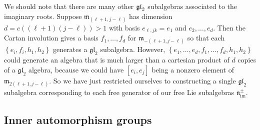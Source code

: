 \documentclass[11pt,letterpaper]{amsart}
\numberwithin{thecounter}{section}
\theoremstyle{definition}
\DeclareMathOperator{\im}{{im}}
\newcommand{\nimpm}{{\mathfrak{n}_{\im}^\pm}}
\begin{document}
%
%
%
%
%
%

We should note that there are many other $\frak{gl}_2$ subalgebras associated to the imaginary roots.
Suppose $\mathfrak{m}_{(\ell+1,j-\ell)}$ has dimension $d=c\left((\ell+1)(j-\ell) \right)>1$ with basis $e_{\ell,jk}=e_1$ and $e_2, \dots , e_d$. Then the Cartan involution gives a basis $f_1,\dots,f_d$ for $\mathfrak{m}_{-(\ell+1,j-\ell)}$ so that each  $\left\{e_i,f_i,h_1,h_2 \right\}$ generates a $\mathfrak{gl}_2$ subalgebra. However, $\left\{e_1,\dots,e_d,f_1,\dots,f_d,h_1,h_2 \right\}$ could generate an algebra that is much larger than a cartesian  product of $d$ copies of a $\mathfrak{gl}_2$ algebra, because we could have $\left[e_i,e_j \right]$ being a nonzero element of $\mathfrak{m}_{2(\ell+1,j-\ell)}$. 
So we have just restricted ourselves to constructing a single  $\mathfrak{gl}_2$ subalgebra corresponding to each free generator of our free  Lie subalgebras $\nimpm$.



\subsection{Inner automorphism groups}\label{SS-inner}
\end{document}
